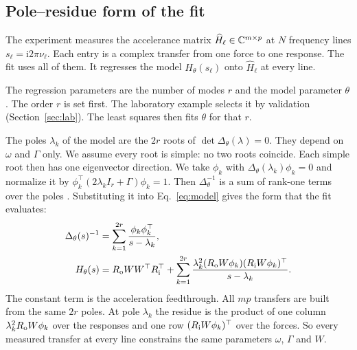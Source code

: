 \subsection{Pole--residue form of the fit}
The experiment measures the accelerance matrix
$\widehat H_\ell\in\mathbb C^{m\times p}$ at $N$ frequency lines
$s_\ell=\mathrm i2\pi\nu_\ell$. Each entry is a complex transfer from one
force to one response. The fit uses all of them. It regresses the model
$H_\theta(s_\ell)$ onto $\widehat H_\ell$ at every line.

The regression parameters are the number of modes $r$ and the model
parameter $\theta$. The order $r$ is set first. The laboratory example
selects it by validation (Section~\ref{sec:lab}). The least squares then
fits $\theta$ for that $r$.

The poles $\lambda_k$ of the model are the $2r$ roots of
$\det\Delta_\theta(\lambda)=0$. They depend on $\omega$ and $\Gamma$ only.
We assume every root is simple: no two roots coincide. Each simple root then
has one eigenvector direction. We take $\phi_k$ with
$\Delta_\theta(\lambda_k)\phi_k=0$ and normalize it by
$\phi_k^{\top}(2\lambda_kI_r+\Gamma)\phi_k=1$. Then $\Delta_\theta^{-1}$ is a
sum of rank-one terms over the poles \citep{lancaster1966,tisseur2001}.
Substituting it into Eq.~\eqref{eq:model} gives the form that the fit
evaluates:
\begin{equation}
 \begin{aligned}
 \Delta_\theta(s)^{-1}&=\sum_{k=1}^{2r}\frac{\phi_k\phi_k^{\top}}{s-\lambda_k},\\
 H_\theta(s)&=R_{\rm o}WW^{\top}R_{\rm i}^{\top}
 +\sum_{k=1}^{2r}\frac{\lambda_k^2(R_{\rm o}W\phi_k)(R_{\rm i}W\phi_k)^{\top}}{s-\lambda_k}.
 \end{aligned}
 \label{eq:poleresidue}
\end{equation}
The constant term is the acceleration feedthrough. All $mp$ transfers are
built from the same $2r$ poles. At pole $\lambda_k$ the residue is the
product of one column $\lambda_k^2R_{\rm o}W\phi_k$ over the responses and
one row $(R_{\rm i}W\phi_k)^{\top}$ over the forces. So every measured
transfer at every line constrains the same parameters $\omega$, $\Gamma$ and
$W$.

